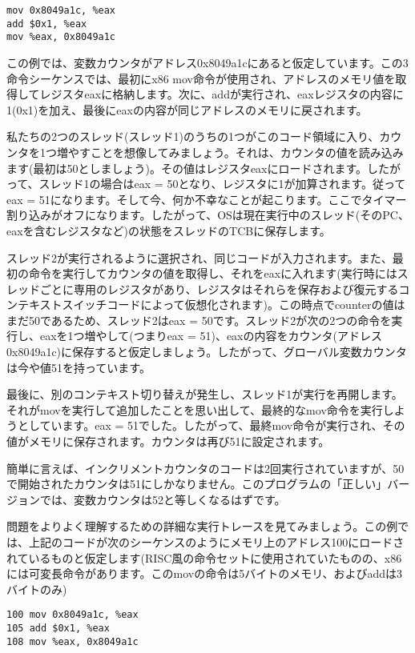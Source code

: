 \begin{verbatim}
mov 0x8049a1c, %eax
add $0x1, %eax
mov %eax, 0x8049a1c
\end{verbatim}

この例では、変数カウンタがアドレス0x8049a1cにあると仮定しています。この3命令シーケンスでは、最初にx86
mov命令が使用され、アドレスのメモリ値を取得してレジスタeaxに格納します。次に、addが実行され、eaxレジスタの内容に1(0x1)を加え、最後にeaxの内容が同じアドレスのメモリに戻されます。

私たちの2つのスレッド(スレッド1)のうちの1つがこのコード領域に入り、カウンタを1つ増やすことを想像してみましょう。それは、カウンタの値を読み込みます(最初は50としましょう)。その値はレジスタeaxにロードされます。したがって、スレッド1の場合はeax
= 50となり、レジスタに1が加算されます。従ってeax =
51になります。そして今、何か不幸なことが起こります。ここでタイマー割り込みがオフになります。したがって、OSは現在実行中のスレッド(そのPC、eaxを含むレジスタなど)の状態をスレッドのTCBに保存します。

スレッド2が実行されるように選択され、同じコードが入力されます。また、最初の命令を実行してカウンタの値を取得し、それをeaxに入れます(実行時にはスレッドごとに専用のレジスタがあり、レジスタはそれらを保存および復元するコンテキストスイッチコードによって仮想化されます)。この時点でcounterの値はまだ50であるため、スレッド2はeax
= 50です。スレッド2が次の2つの命令を実行し、eaxを1つ増やして(つまりeax =
51)、eaxの内容をカウンタ(アドレス0x8049a1c)に保存すると仮定しましょう。したがって、グローバル変数カウンタは今や値51を持っています。

最後に、別のコンテキスト切り替えが発生し、スレッド1が実行を再開します。それがmovを実行して追加したことを思い出して、最終的なmov命令を実行しようとしています。eax
=
51でした。したがって、最終mov命令が実行され、その値がメモリに保存されます。カウンタは再び51に設定されます。

簡単に言えば、インクリメントカウンタのコードは2回実行されていますが、50で開始されたカウンタは51にしかなりません。このプログラムの「正しい」バージョンでは、変数カウンタは52と等しくなるはずです。

問題をよりよく理解するための詳細な実行トレースを見てみましょう。この例では、上記のコードが次のシーケンスのようにメモリ上のアドレス100にロードされているものと仮定します(RISC風の命令セットに使用されていたものの、x86には可変長命令があります。このmovの命令は5バイトのメモリ、およびaddは3バイトのみ)

\begin{verbatim}
100 mov 0x8049a1c, %eax
105 add $0x1, %eax
108 mov %eax, 0x8049a1c
\end{verbatim}


